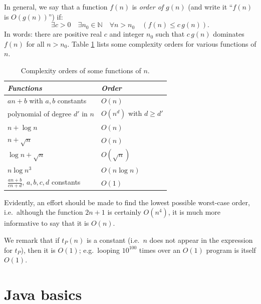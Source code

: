 \documentclass[a4paper]{book}
\theoremstyle{changebreak}                %
\begin{document}
In general, we say that a function $f(n)$ is {\it
  order of $g(n)$} (and write it ``$f(n)$ is
$O(g(n))$'') if:
\begin{equation}
  \exists c > 0 \quad \exists n_0\in\mathbb{N} \quad \forall n>n_0
    \quad (f(n) \le c\, g(n)).
\end{equation}
In words: there are positive real $c$ and integer $n_0$ such that
$c\,g(n)$ dominates $f(n)$ for all $n>n_0$. Table \ref{tab:orders}
lists some complexity orders for various functions of $n$.
\begin{table}[!ht]
\begin{center}
\begin{tabular}{|l|l|} \hline
{\it Functions} & {\it Order} \\ \hline
$an+b$ with $a,b$ constants & $O(n)$ \\
polynomial of degree $d'$ in $n$ & $O(n^d)$ with $d\ge d'$ \\
$n+\log n$ & $O(n)$ \\ 
$n+\sqrt{n}$ & $O(n)$ \\
$\log n+\sqrt{n}$ & $O(\sqrt{n})$ \\
$n\log n^3$ & $O(n\log n)$ \\ 
$\frac{an+b}{cn+d}$, $a,b,c,d$ constants & $O(1)$ \\
\hline
\end{tabular}
\end{center}
\caption{Complexity orders of some functions of $n$.}
\label{tab:orders}
\end{table}
Evidently, an effort should be made to find the lowest possible
worst-case order, i.e.~although the function $2n+1$ is certainly
$O(n^4)$, it is much more informative to say that it is $O(n)$.

We remark that if $t_P(n)$ is a constant (i.e.~$n$
does not appear in the expression for $t_P$), then it is $O(1)$;
e.g.~looping $10^{100}$ times over an $O(1)$ program is itself $O(1)$.


\chapter{Java basics}
\label{c:java}

\begin{center}
\end{center}
\end{document}
